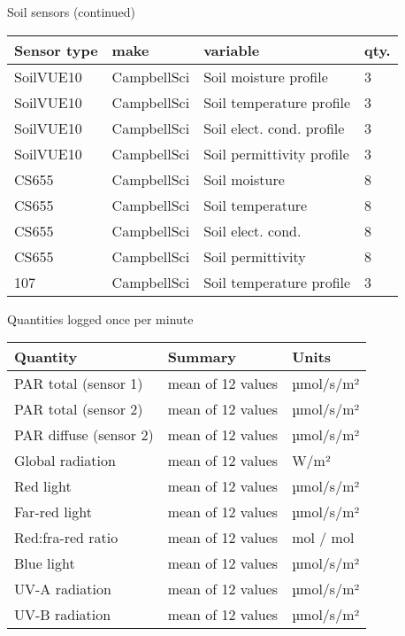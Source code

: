 \documentclass[
  ignorenonframetext,
]{beamer}
\begin{document}
\begin{frame}{Soil sensors (continued)}
\protect\hypertarget{soil-sensors-continued}{}
\begin{longtable}[]{@{}llll@{}}
\toprule
Sensor type & make & variable & qty. \\
\midrule
\endhead
SoilVUE10 & CampbellSci & Soil moisture profile & 3 \\
SoilVUE10 & CampbellSci & Soil temperature profile & 3 \\
SoilVUE10 & CampbellSci & Soil elect. cond. profile & 3 \\
SoilVUE10 & CampbellSci & Soil permittivity profile & 3 \\
CS655 & CampbellSci & Soil moisture & 8 \\
CS655 & CampbellSci & Soil temperature & 8 \\
CS655 & CampbellSci & Soil elect. cond. & 8 \\
CS655 & CampbellSci & Soil permittivity & 8 \\
107 & CampbellSci & Soil temperature profile & 3 \\
\bottomrule
\end{longtable}
\end{frame}

\begin{frame}{Quantities logged once per minute}
\protect\hypertarget{quantities-logged-once-per-minute}{}
\begin{longtable}[]{@{}lll@{}}
\toprule
Quantity & Summary & Units \\
\midrule
\endhead
PAR total (sensor 1) & mean of 12 values & µmol/s/m² \\
PAR total (sensor 2) & mean of 12 values & µmol/s/m² \\
PAR diffuse (sensor 2) & mean of 12 values & µmol/s/m² \\
Global radiation & mean of 12 values & W/m² \\
Red light & mean of 12 values & µmol/s/m² \\
Far-red light & mean of 12 values & µmol/s/m² \\
Red:fra-red ratio & mean of 12 values & mol / mol \\
Blue light & mean of 12 values & µmol/s/m² \\
UV-A radiation & mean of 12 values & µmol/s/m² \\
UV-B radiation & mean of 12 values & µmol/s/m² \\
\bottomrule
\end{longtable}
\end{frame}
\end{document}

